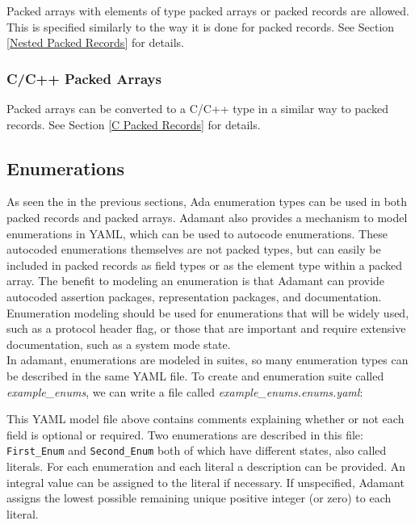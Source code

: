 Packed arrays with elements of type packed arrays or packed records are allowed. This is specified similarly to the way it is done for packed records. See Section \ref{Nested Packed Records} for details.

\subsubsection{C/C++ Packed Arrays}

Packed arrays can be converted to a C/C++ type in a similar way to packed records. See Section \ref{C Packed Records} for details.

\subsection{Enumerations}

As seen the in the previous sections, Ada enumeration types can be used in both packed records and packed arrays. Adamant also provides a mechanism to model enumerations in YAML, which can be used to autocode enumerations. These autocoded enumerations themselves are not packed types, but can easily be included in packed records as field types or as the element type within a packed array. The benefit to modeling an enumeration is that Adamant can provide autocoded assertion packages, representation packages, and documentation. Enumeration modeling should be used for enumerations that will be widely used, such as a protocol header flag, or those that are important and require extensive documentation, such as a system mode state. \\

In adamant, enumerations are modeled in suites, so many enumeration types can be described in the same YAML file. To create and enumeration suite called \textit{example\_enums}, we can write a file called \textit{example\_enums.enums.yaml}:


This YAML model file above contains comments explaining whether or not each field is optional or required. Two enumerations are described in this file: \texttt{First\_Enum} and \texttt{Second\_Enum} both of which have different states, also called literals. For each enumeration and each literal a description can be provided. An integral value can be assigned to the literal if necessary. If unspecified, Adamant assigns the lowest possible remaining unique positive integer (or zero) to each literal.

